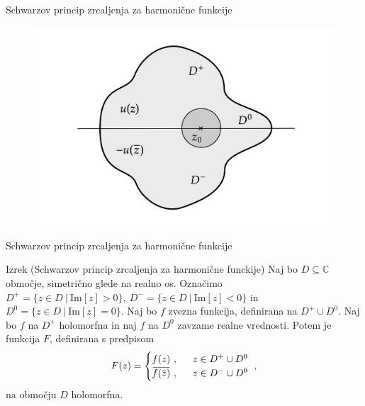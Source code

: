 \documentclass{beamer}
\newcommand{\overbar}[1]{\mkern 1.5mu\overline{\mkern-1.5mu#1\mkern-1.5mu}\mkern 1.5mu}
\theoremstyle{definition}
\theoremstyle{definition}
\begin{document}
\begin{frame}{Schwarzov princip zrcaljenja za harmonične funkcije}
   \begin{figure}
   \begin{center}
      \includegraphics[width=\textwidth]{schwarz_harm.png}
   \end{center}
   \end{figure}
\end{frame}

\begin{frame}{Schwarzov princip zrcaljenja za harmonične funkcije}
    \begin{exampleblock}{Izrek (Schwarzov princip zrcaljenja za harmonične funckije)}
        Naj bo $D \subseteq \mathbb{C}$ območje, simetrično glede na realno os. 
        Označimo $D^{+} = \{z \in D~|~\text{Im}[z] > 0\},~D^{-} = \{z \in D~|~\text{Im}[z] < 0\}$ in $D^{0} = \{z \in D~|~\text{Im}[z] = 0\}$.
        Naj bo $f$ zvezna funkcija, definirana na $D^{+} \cup D^0$. Naj bo $f$ na $D^{+}$ holomorfna in naj $f$ na $D^0$ zavzame realne vrednosti.
        Potem je funkcija $F$, definirana s predpisom
        $$
        F(z) = 
        \begin{cases}
            f(z)~,~~&z \in D^{+} \cup D^0\\
            \overbar{f(\overbar{z})}~,~~&z \in D^{-} \cup D^0
        \end{cases}~,
        $$
        na območju $D$ holomorfna.
    \end{exampleblock}
\end{frame}


\end{document}
